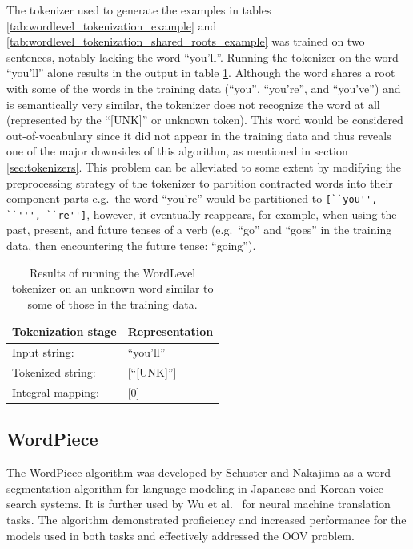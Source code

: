\documentclass[12pt]{article}
\begin{document}
The tokenizer used to generate the examples in tables \ref{tab:wordlevel_tokenization_example} and
\ref{tab:wordlevel_tokenization_shared_roots_example} was trained on two sentences, notably lacking the word ``you'll''. Running the tokenizer on the
word ``you'll'' alone results in the output in table \ref{tab:wordlevel_unk_word}. Although the word shares a root with some of the words in the
training data (``you'', ``you're'', and ``you've'') and is semantically very similar, the tokenizer does not recognize the word at all (represented
by the ``[UNK]'' or unknown token). This word would be considered out-of-vocabulary since it did not appear in the training data and thus reveals one
of the major downsides of this algorithm, as mentioned in section \ref{sec:tokenizers}. This problem can be alleviated to some extent by modifying the
preprocessing strategy of the tokenizer to partition contracted words into their component parts e.g.~the word ``you're'' would be partitioned to
\lstinline|[``you'', ``''', ``re'']|, however, it eventually reappears, for example, when using the past, present, and future tenses of a verb
(e.g.~``go'' and ``goes'' in the training data, then encountering the future tense: ``going'').

\begin{table}[!t]
    \centering
    \begin{tabular}{l l}
        \toprule
        Tokenization stage & Representation \\
        \midrule
        Input string:      & ``you'll''     \\
        Tokenized string:  & [``[UNK]'']    \\
        Integral mapping:  & [0]            \\
        \bottomrule
    \end{tabular}
    \caption{Results of running the WordLevel tokenizer on an unknown word similar to some of those in the training data.}
    \label{tab:wordlevel_unk_word}
\end{table}

\subsection{WordPiece}\label{sec:wordpiece}
The WordPiece algorithm was developed by Schuster and Nakajima \cite{schuster_japanese_2012} as a word segmentation algorithm for language modeling in
Japanese and Korean voice search systems. It is further used by Wu et al.~\cite{wu_googles_2016} for neural machine translation tasks. The algorithm
demonstrated proficiency and increased performance for the models used in both tasks and effectively addressed the OOV problem.
\end{document}
